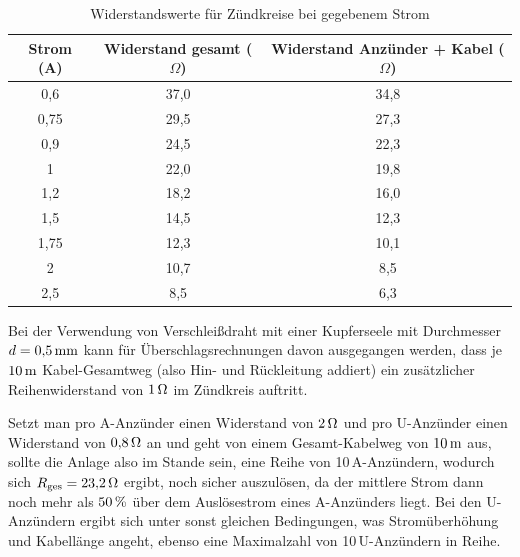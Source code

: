 \documentclass[pdftex, parskip, numbers=noenddot, toc=listof]{scrbook}
\begin{document}
				\begin{table}
					\centering
					\begin{tabular}{ccc}
						Strom (A) & Widerstand gesamt ($\Omega$) & Widerstand Anzünder + Kabel ($\Omega$) \\ \hline\hline
						0,6       & 37,0                         & 34,8                                    \\
						0,75      & 29,5                         & 27,3                                    \\
						0,9       & 24,5                         & 22,3                                    \\
						1         & 22,0                         & 19,8                                    \\
						1,2       & 18,2                         & 16,0                                    \\
						1,5       & 14,5                         & 12,3                                    \\
						1,75      & 12,3                         & 10,1                                    \\
						2         & 10,7                         & 8,5                                     \\
						2,5       & 8,5                          & 6,3                                     \\ \hline
					\end{tabular}
					\caption{Widerstandswerte für Zündkreise bei gegebenem Strom}
					\label{tab:r-vs-i}
				\end{table}

				Bei der Verwendung von Verschleißdraht mit einer Kupferseele mit Durchmesser $d = \unit[0{,}5]{mm}$ kann für Überschlagsrechnungen davon ausgegangen werden, dass je $\unit[10]{m}$ Kabel-Gesamtweg (also Hin- und Rückleitung addiert) ein zusätzlicher Reihenwiderstand von $\unit[1]{\Omega}$ im Zündkreis auftritt.

				Setzt man pro A-Anzünder einen Widerstand von $\unit[2]{\Omega}$ und pro U-Anzünder einen Widerstand von $\unit[0{,}8]{\Omega}$ an und geht von einem Gesamt-Kabelweg von $\unit[10]{m}$ aus, sollte die Anlage also im Stande sein, eine Reihe von 10\,A-Anzündern, wodurch sich $R_\text{ges} = \unit[23{,}2]{\Omega}$ ergibt, noch sicher auszulösen, da der mittlere Strom dann noch mehr als $\unit[50]{\%}$ über dem Auslösestrom eines A-Anzünders liegt. Bei den U-Anzündern ergibt sich unter sonst gleichen Bedingungen, was Stromüberhöhung und Kabellänge angeht, ebenso eine Maximalzahl von 10\,U-Anzündern in Reihe.
\end{document}
